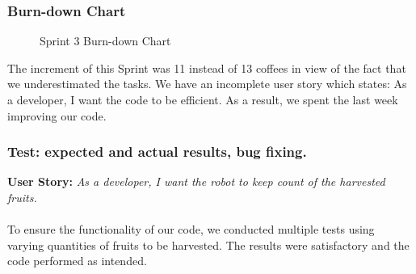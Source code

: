 \subsubsection{Burn-down Chart}\label{sec:sprint3bdc}
\begin{figure}[H]
	\centering
	\vspace{-1mm}
	\caption{Sprint 3 Burn-down Chart}
	\label{fig:sprint3BurndownChart}
\end{figure}

\noindent The increment of this Sprint was 11 instead of 13 coffees in view of the fact that we underestimated the tasks. We have an incomplete user story which states: As a developer, I want the code to be efficient. As a result, we spent the last week improving our code.

\subsubsection{Test: expected and actual results, bug fixing.}

\textbf{User Story:} \emph{As a developer, I want the robot to keep count of the harvested fruits.}\\~\\
To ensure the functionality of our code, we conducted multiple tests using varying quantities of fruits to be harvested. The results were satisfactory and the code performed as intended.
\newpage
